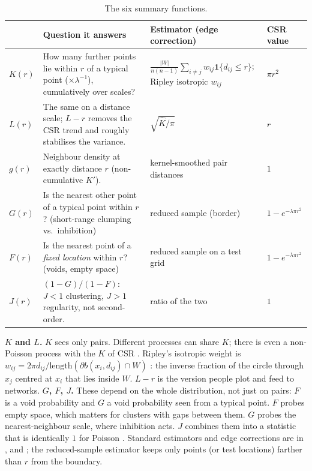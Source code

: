 \documentclass[10pt,a4paper]{article}
\begin{document}
\begin{table}[ht]
\centering\small
\begin{tabularx}{\linewidth}{@{}l X X l@{}}
\toprule
 & Question it answers & Estimator (edge correction) & CSR value\\
\midrule
$K(r)$ & How many further points lie within $r$ of a typical point ($\times\lambda^{-1}$), cumulatively over scales? & $\frac{|W|}{n(n-1)}\sum_{i\ne j}w_{ij}\mathbf 1\{d_{ij}\le r\}$; Ripley isotropic $w_{ij}$ & $\pi r^2$\\
$L(r)$ & The same on a distance scale; $L-r$ removes the CSR trend and roughly stabilises the variance. & $\sqrt{\hat K/\pi}$ & $r$\\
$g(r)$ & Neighbour density at exactly distance $r$ (non-cumulative $K'$). & kernel-smoothed pair distances & $1$\\
$G(r)$ & Is the nearest other point of a typical point within $r$? (short-range clumping vs.\ inhibition) & reduced sample (border) & $1-e^{-\lambda\pi r^2}$\\
$F(r)$ & Is the nearest point of a \emph{fixed location} within $r$? (voids, empty space) & reduced sample on a test grid & $1-e^{-\lambda\pi r^2}$\\
$J(r)$ & $(1-G)/(1-F)$: $J<1$ clustering, $J>1$ regularity, not second-order. & ratio of the two & $1$\\
\bottomrule
\end{tabularx}
\caption{The six summary functions.}
\label{tab:sf}
\end{table}

\textbf{$K$ and $L$.} $K$ sees only pairs. Different processes can share $K$; there is even a non-Poisson process with the $K$ of CSR \citep{BaddeleySilverman1984}. Ripley's isotropic weight is $w_{ij}=2\pi d_{ij}/\mathrm{length}(\partial b(x_i,d_{ij})\cap W)$ \citep{Ripley1977}: the inverse fraction of the circle through $x_j$ centred at $x_i$ that lies inside $W$. $L-r$ is the version people plot and feed to networks.
\textbf{$G$, $F$, $J$.} These depend on the whole distribution, not just on pairs: $F$ is a void probability and $G$ a void probability seen from a typical point. $F$ probes empty space, which matters for clusters with gaps between them. $G$ probes the nearest-neighbour scale, where inhibition acts. $J$ combines them into a statistic that is identically $1$ for Poisson \citep{vanLieshoutBaddeley1996}. Standard estimators and edge corrections are in \citet{Diggle2013}, \citet{Illian2008} and \citet{Baddeley2015}; the reduced-sample estimator keeps only points (or test locations) farther than $r$ from the boundary.
\end{document}
